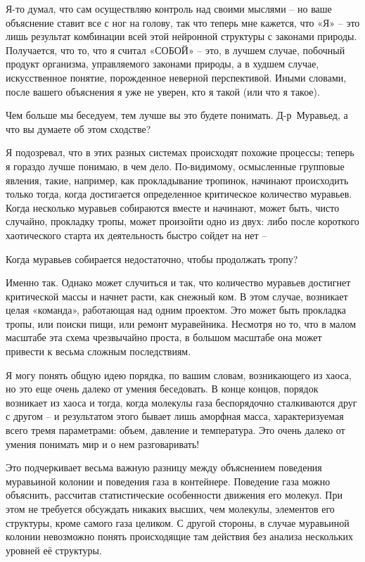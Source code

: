 \documentclass[../main.tex]{subfiles}
\begin{document}
\begin{dialogue}
 Я-то думал, что сам осуществляю контроль над своими мыслями \--- но ваше объяснение ставит все с ног на голову, так что теперь мне кажется, что «Я» \--- это лишь результат комбинации всей этой нейронной структуры с законами природы. Получается, что то, что я считал «СОБОЙ» \--- это, в лучшем случае, побочный продукт организма, управляемого законами природы, а в худшем случае, искусственное понятие, порожденное неверной перспективой. Иными словами, после вашего объяснения я уже не уверен, кто я такой (или что я такое).

 Чем больше мы беседуем, тем лучше вы это будете понимать. Д-р~Муравьед, а что вы думаете об этом сходстве?

 Я подозревал, что в этих разных системах происходят похожие процессы; теперь я гораздо лучше понимаю, в чем дело. По-видимому, осмысленные групповые явления, такие, например, как прокладывание тропинок, начинают происходить только тогда, когда достигается определенное критическое количество муравьев. Когда несколько муравьев собираются вместе и начинают, может быть, чисто случайно, прокладку тропы, может произойти одно из двух: либо после короткого хаотического старта их деятельность быстро сойдет на нет \---

 Когда муравьев собирается недостаточно, чтобы продолжать тропу?

 Именно так. Однако может случиться и так, что количество муравьев достигнет критической массы и начнет расти, как снежный ком. В этом случае, возникает целая «команда», работающая над одним проектом. Это может быть прокладка тропы, или поиски пищи, или ремонт муравейника. Несмотря но то, что в малом масштабе эта схема чрезвычайно проста, в большом масштабе она может привести к весьма сложным последствиям.

 Я могу понять общую идею порядка, по вашим словам, возникающего из хаоса, но это еще очень далеко от умения беседовать. В конце концов, порядок возникает из хаоса и тогда, когда молекулы газа беспорядочно сталкиваются друг с другом \--- и результатом этого бывает лишь аморфная масса, характеризуемая всего тремя параметрами: объем, давление и температура. Это очень далеко от умения понимать мир и о нем разговаривать!

 Это подчеркивает весьма важную разницу между объяснением поведения муравьиной колонии и поведения газа в контейнере. Поведение газа можно объяснить, рассчитав статистические особенности движения его молекул. При этом не требуется обсуждать никаких высших, чем молекулы, элементов его структуры, кроме самого газа целиком. С другой стороны, в случае муравьиной колонии невозможно понять происходящие там действия без анализа нескольких уровней её структуры.


\end{dialogue}
\end{document}
